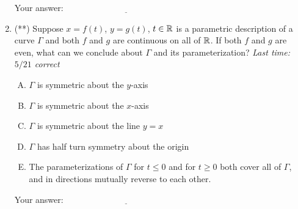 \documentclass[10pt]{amsart}
\begin{document}
\begin{enumerate}
  \vspace{0.1in}
  Your answer: $\underline{\qquad\qquad\qquad\qquad\qquad\qquad\qquad}$
  \vspace{0.6in}

\item (**) Suppose $x = f(t)$, $y = g(t)$, $t \in \mathbb{R}$ is a parametric
  description of a curve $\Gamma$ and both $f$ and $g$ are continuous
  on all of $\mathbb{R}$. If both $f$ and $g$ are even, what can we conclude
  about $\Gamma$ and its parameterization? {\em Last time: $5/21$
    correct}

  \begin{enumerate}[(A)]
  \item $\Gamma$ is symmetric about the $y$-axis
  \item $\Gamma$ is symmetric about the $x$-axis
  \item $\Gamma$ is symmetric about the line $y = x$
  \item $\Gamma$ has half turn symmetry about the origin
  \item The parameterizations of $\Gamma$ for $t \le 0$ and for $t \ge
    0$ both cover all of $\Gamma$, and in directions mutually reverse
    to each other.
  \end{enumerate}

  \vspace{0.1in}
  Your answer: $\underline{\qquad\qquad\qquad\qquad\qquad\qquad\qquad}$
  \vspace{0.6in}

\end{enumerate}
\end{document}
